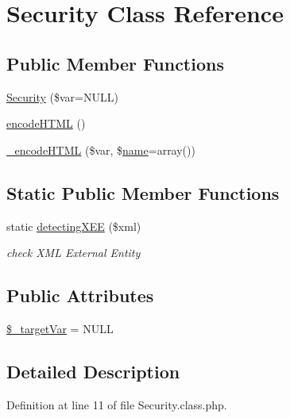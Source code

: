 \hypertarget{classSecurity}{}\section{Security Class Reference}
\label{classSecurity}
\subsection*{Public Member Functions}
\begin{DoxyCompactItemize}
\item 
\hyperlink{classSecurity_ab74d8099e74ecc760f9328fce70760c7}{Security} (\$var=N\+U\+LL)
\item 
\hyperlink{classSecurity_a55da0eb544c3f7eeb6f818578fd0b393}{encode\+H\+T\+ML} ()
\item 
\hyperlink{classSecurity_a70d05408553b1e5d0022272d064b5085}{\+\_\+encode\+H\+T\+ML} (\$var, \$\hyperlink{common_8js_a22c29d2aa8ed6161ce8faa718ef76e68}{name}=array())
\end{DoxyCompactItemize}
\subsection*{Static Public Member Functions}
\begin{DoxyCompactItemize}
\item 
static \hyperlink{classSecurity_a6de571a78c6e950bdcaf2e61583418a0}{detecting\+X\+EE} (\$xml)
\begin{DoxyCompactList}\small\item\em check X\+ML External Entity \end{DoxyCompactList}\end{DoxyCompactItemize}
\subsection*{Public Attributes}
\begin{DoxyCompactItemize}
\item 
\hyperlink{classSecurity_a28ff37b08bd7a592552cf5af13f7ac74}{\$\+\_\+target\+Var} = N\+U\+LL
\end{DoxyCompactItemize}


\subsection{Detailed Description}


Definition at line 11 of file Security.\+class.\+php.



